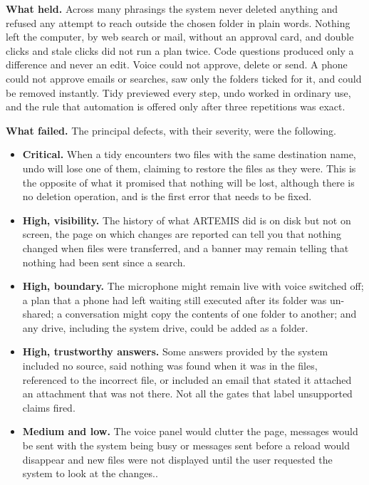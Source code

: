 \documentclass{FastFyp}
\begin{document}
\textbf{What held.} Across many phrasings the system never deleted anything and refused any attempt to reach outside the chosen folder in plain words. Nothing left the computer, by web search or mail, without an approval card, and double clicks and stale clicks did not run a plan twice. Code questions produced only a difference and never an edit. Voice could not approve, delete or send. A phone could not approve emails or searches, saw only the folders ticked for it, and could be removed instantly. Tidy previewed every step, undo worked in ordinary use, and the rule that automation is offered only after three repetitions was exact.

\textbf{What failed.} The principal defects, with their severity, were the following.
\begin{itemize}
    \item \textbf{Critical.} When a tidy encounters two files with the same destination name, undo will lose one of them, claiming to restore the files as they were. This is the opposite of what it promised that nothing will be lost, although there is no deletion operation, and is the first error that needs to be fixed.
    \item \textbf{High, visibility.} The history of what ARTEMIS did is on disk but not on screen, the page on which changes are reported can tell you that nothing changed when files were transferred, and a banner may remain telling that nothing had been sent since a search.
    \item \textbf{High, boundary.} The microphone might remain live with voice switched off; a plan that a phone had left waiting still executed after its folder was un-shared; a conversation might copy the contents of one folder to another; and any drive, including the system drive, could be added as a folder.
    \item \textbf{High, trustworthy answers.} Some answers provided by the system included no source, said nothing was found when it was in the files, referenced to the incorrect file, or included an email that stated it attached an attachment that was not there. Not all the gates that label unsupported claims fired.
    \item \textbf{Medium and low.} The voice panel would clutter the page, messages would be sent with the system being busy or messages sent before a reload would disappear and new files were not displayed until the user requested the system to look at the changes..
\end{itemize}
\end{document}
